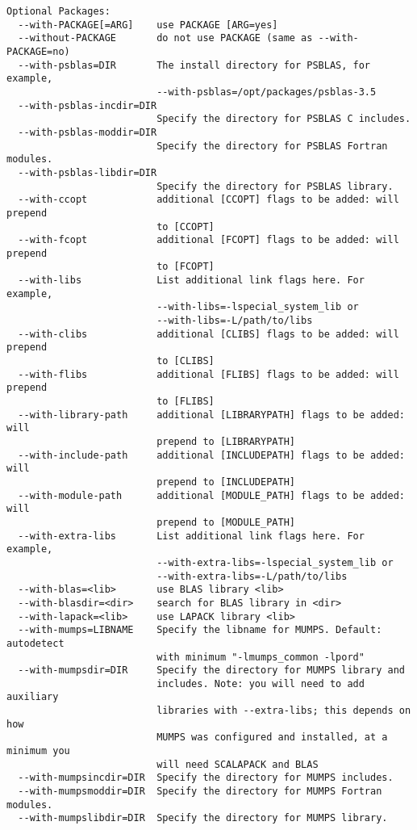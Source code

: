 \begin{verbatim}
Optional Packages:
  --with-PACKAGE[=ARG]    use PACKAGE [ARG=yes]
  --without-PACKAGE       do not use PACKAGE (same as --with-PACKAGE=no)
  --with-psblas=DIR       The install directory for PSBLAS, for example,
                          --with-psblas=/opt/packages/psblas-3.5
  --with-psblas-incdir=DIR
                          Specify the directory for PSBLAS C includes.
  --with-psblas-moddir=DIR
                          Specify the directory for PSBLAS Fortran modules.
  --with-psblas-libdir=DIR
                          Specify the directory for PSBLAS library.
  --with-ccopt            additional [CCOPT] flags to be added: will prepend
                          to [CCOPT]
  --with-fcopt            additional [FCOPT] flags to be added: will prepend
                          to [FCOPT]
  --with-libs             List additional link flags here. For example,
                          --with-libs=-lspecial_system_lib or
                          --with-libs=-L/path/to/libs
  --with-clibs            additional [CLIBS] flags to be added: will prepend
                          to [CLIBS]
  --with-flibs            additional [FLIBS] flags to be added: will prepend
                          to [FLIBS]
  --with-library-path     additional [LIBRARYPATH] flags to be added: will
                          prepend to [LIBRARYPATH]
  --with-include-path     additional [INCLUDEPATH] flags to be added: will
                          prepend to [INCLUDEPATH]
  --with-module-path      additional [MODULE_PATH] flags to be added: will
                          prepend to [MODULE_PATH]
  --with-extra-libs       List additional link flags here. For example,
                          --with-extra-libs=-lspecial_system_lib or
                          --with-extra-libs=-L/path/to/libs
  --with-blas=<lib>       use BLAS library <lib>
  --with-blasdir=<dir>    search for BLAS library in <dir>
  --with-lapack=<lib>     use LAPACK library <lib>
  --with-mumps=LIBNAME    Specify the libname for MUMPS. Default: autodetect
                          with minimum "-lmumps_common -lpord"
  --with-mumpsdir=DIR     Specify the directory for MUMPS library and
                          includes. Note: you will need to add auxiliary
                          libraries with --extra-libs; this depends on how
                          MUMPS was configured and installed, at a minimum you
                          will need SCALAPACK and BLAS
  --with-mumpsincdir=DIR  Specify the directory for MUMPS includes.
  --with-mumpsmoddir=DIR  Specify the directory for MUMPS Fortran modules.
  --with-mumpslibdir=DIR  Specify the directory for MUMPS library.

\end{verbatim}

